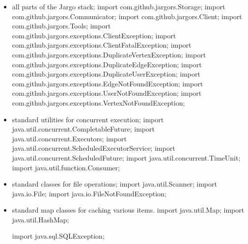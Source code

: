 \documentclass{article}
\def\nwendcode{\endtrivlist \endgroup}      %
\let\nwdocspar=\par
\begin{document}
\begin{itemize}
\item all parts of the Jargo stack;
\nwenddocs{}\plusendmoddef
import com.github.jargors.Storage;
import com.github.jargors.Communicator;
import com.github.jargors.Client;
import com.github.jargors.Tools;
import com.github.jargors.exceptions.ClientException;
import com.github.jargors.exceptions.ClientFatalException;
import com.github.jargors.exceptions.DuplicateVertexException;
import com.github.jargors.exceptions.DuplicateEdgeException;
import com.github.jargors.exceptions.DuplicateUserException;
import com.github.jargors.exceptions.EdgeNotFoundException;
import com.github.jargors.exceptions.UserNotFoundException;
import com.github.jargors.exceptions.VertexNotFoundException;
\nwendcode{}\item standard utilities for concurrent execution;
\nwenddocs{}\plusendmoddef
import java.util.concurrent.CompletableFuture;
import java.util.concurrent.Executors;
import java.util.concurrent.ScheduledExecutorService;
import java.util.concurrent.ScheduledFuture;
import java.util.concurrent.TimeUnit;
import java.util.function.Consumer;
\nwendcode{}\item standard classes for file operations;
\nwenddocs{}\plusendmoddef
import java.util.Scanner;
import java.io.File;
import java.io.FileNotFoundException;
\nwendcode{}\item standard map classes for caching various items.
\nwenddocs{}\plusendmoddef
import java.util.Map;
import java.util.HashMap;
\nwendcode{}\nwdocspar
\nwenddocs{}\plusendmoddef
import java.sql.SQLException;
\nwendcode{}\nwdocspar
\end{itemize}
\end{document}

